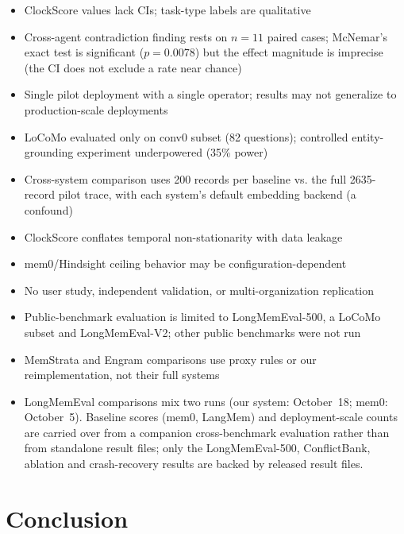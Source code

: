 \documentclass{llncs}
\begin{document}
\begin{itemize}
\item ClockScore values lack CIs; task-type labels are qualitative
\item Cross-agent contradiction finding rests on $n{=}11$ paired cases; McNemar's exact test is significant ($p{=}0.0078$) but the effect magnitude is imprecise (the CI does not exclude a rate near chance)
\item Single pilot deployment with a single operator; results may not generalize to production-scale deployments
\item LoCoMo evaluated only on conv0 subset (82 questions); controlled entity-grounding experiment underpowered (35\% power)
\item Cross-system comparison uses 200 records per baseline vs. the full 2{}635-record pilot trace, with each system's default embedding backend (a confound)
\item ClockScore conflates temporal non-stationarity with data leakage
\item mem0/Hindsight ceiling behavior may be configuration-dependent
\item No user study, independent validation, or multi-organization replication
\item Public-benchmark evaluation is limited to LongMemEval-500, a LoCoMo subset and LongMemEval-V2; other public benchmarks were not run
\item MemStrata and Engram comparisons use proxy rules or our reimplementation, not their full systems
\item LongMemEval comparisons mix two runs (our system: October~18; mem0: October~5). Baseline scores (mem0, LangMem) and deployment-scale counts are carried over from a companion cross-benchmark evaluation rather than from standalone result files; only the LongMemEval-500, ConflictBank, ablation and crash-recovery results are backed by released result files.
\end{itemize}

\section{Conclusion}
\end{document}
